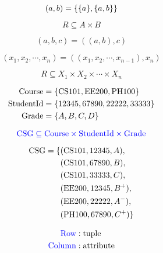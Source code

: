 \begin{frame}{}
  \[
    (a,b) = \{\{a\}, \{a,b\}\}
  \]
  
  \[
    R \subseteq A \times B
  \]

  \pause
  \[
    (a, b, c) = ((a,b), c)
  \]

  \pause
  \[
    (x_1, x_2, \cdots, x_n) = ((x_1, x_2, \cdots, x_{n-1}), x_n)
  \]

  \pause
  \[
    R \subseteq X_1 \times X_2 \times \cdots \times X_n
  \]
\end{frame}

\begin{frame}{}
  \begin{align*}
    \text{Course} &= \{\text{CS}101{}, \text{EE}200{}, \text{PH}100{}\} \\
    \text{StudentId} &= \{12345, 67890, 22222, 33333\}  \\
    \text{Grade} &= \{A, B, C, D\}
  \end{align*}

  \pause
  \[
    \textcolor{blue}{\text{CSG} \subseteq \text{Course}{} \times \text{StudentId}{} \times \text{Grade}{}}
  \]

  \begin{align*}
    \text{CSG} = \{ &(\text{CS}101{}, 12345, A), \\
      & (\text{CS}101{}, 67890, B), \\
      & (\text{CS}101{}, 33333, C), \\
      & (\text{EE}200{}, 12345, B^{+}), \\
      & (\text{EE}200{}, 22222, A^{-}), \\
      & (\text{PH}100{}, 67890, C^{+}) \}
  \end{align*}
\end{frame}

\begin{frame}{}

  \pause
  \begin{align*}
    \text{\textcolor{blue}{Row}} &: \text{tuple} \\
    \text{\textcolor{blue}{Column}} &: \text{attribute}
  \end{align*}
\end{frame}

\begin{frame}{}

  \begin{columns}
  \end{columns}
\end{frame}
